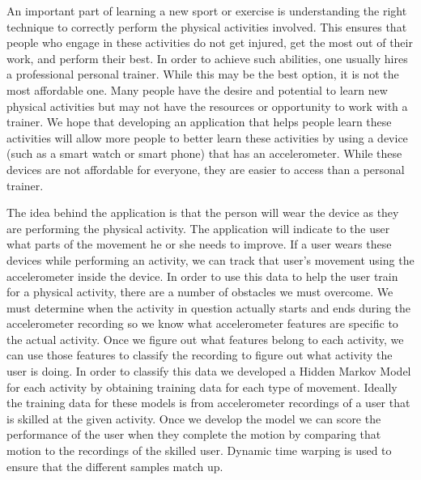 An important part of learning a new sport or exercise is understanding the right technique to correctly perform the physical activities involved. This ensures that people who engage in these activities do not get injured, get the most out of their work, and perform their best. In order to achieve such abilities, one usually hires a professional personal trainer. While this may be the best option, it is not the most affordable one. Many people have the desire and potential to learn new physical activities but may not have the resources or opportunity to work with a trainer. We hope that developing an application that helps people learn these activities will allow more people to better learn these activities by using a device (such as a smart watch or smart phone) that has an accelerometer. While these devices are not affordable for everyone, they are easier to access than a personal trainer.

The idea behind the application is that the person will wear the device as they are performing the physical activity. The application will indicate to the user what parts of the movement he or she needs to improve. If a user wears these devices while performing an activity, we can track that user’s movement using the accelerometer inside the device. In order to use this data to help the user train for a physical activity, there are a number of obstacles we must overcome. We must determine when the activity in question actually starts and ends during the accelerometer recording so we know what accelerometer features are specific to the actual activity. Once we figure out what features belong to each activity, we can use those features to classify the recording to figure out what activity the user is doing. In order to classify this data we developed a Hidden Markov Model for each activity by obtaining training data for each type of movement. Ideally the training data for these models is from accelerometer recordings of a user that is skilled at the given activity. Once we develop the model we can score the performance of the user when they complete the motion by comparing that motion to the recordings of the skilled user. Dynamic time warping is used to ensure that the different samples match up.


